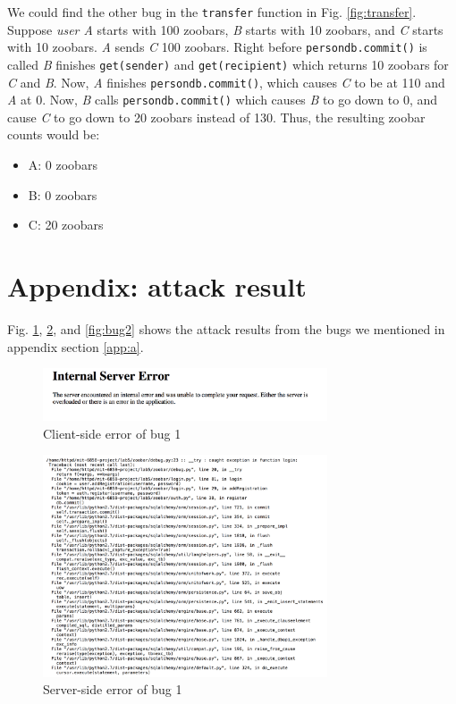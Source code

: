 \documentclass{llncs}
\begin{document}
We could find the other bug in the \texttt{transfer} function in
Fig. \ref{fig:transfer}. Suppose \textit{user A} starts with 100
zoobars, \textit{B} starts with 10 zoobars, and \textit{C} starts with
10 zoobars. \textit{A} sends \textit{C} 100 zoobars. Right before
\texttt{persondb.commit()} is called \textit{B} finishes
\texttt{get(sender)} and \texttt{get(recipient)} which returns 10
zoobars for \textit{C} and \textit{B}. Now, \textit{A} finishes
\texttt{persondb.commit()}, which causes \textit{C} to be at 110 and
\textit{A} at 0. Now, \textit{B} calls \texttt{persondb.commit()}
which causes \textit{B} to go down to 0, and cause \textit{C} to go
down to 20 zoobars instead of 130. Thus, the resulting zoobar counts
would be:
\begin{itemize}
\item A: 0 zoobars
\item B: 0 zoobars
\item C: 20 zoobars
\end{itemize}

\section{Appendix: attack result}

Fig. \ref{fig:bug1c}, \ref{fig:bug1s}, and \ref{fig:bug2} shows the
attack results from the bugs we mentioned in appendix section
\ref{app:a}.

\begin{figure}
  \begin{center}
    \includegraphics[width=0.75\textwidth]{bug1c.png}
  \end{center}
  \caption{Client-side error of bug 1}
  \label{fig:bug1c}
\end{figure}

\begin{figure}
  \begin{center}
    \includegraphics[width=0.75\textwidth]{bug1s.png}
  \end{center}
  \caption{Server-side error of bug 1}
  \label{fig:bug1s}
\end{figure}
\end{document}
